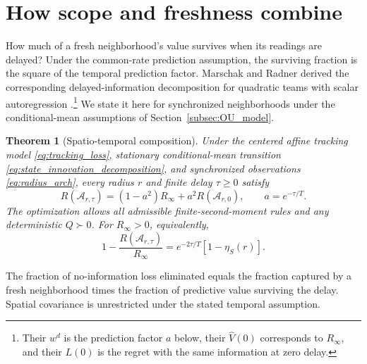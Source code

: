 \documentclass[11pt]{article}
\newtheorem{theorem}{Theorem}
\begin{document}
\section{How scope and freshness combine}
\label{sec:spatiotemporal_predictability}
\label{sec:fresh_local_global}

How much of a fresh neighborhood's value survives when its readings are
delayed? Under the common-rate prediction assumption, the surviving
fraction is the square of the temporal prediction factor. Marschak and
Radner derived the corresponding delayed-information decomposition for
quadratic teams with scalar autoregression
\cite[Ch.~7, Sec.~4, Eqs.~(4.21)--(4.22)]{marschak1972economic}.\footnote{Their
$w^d$ is the prediction factor $a$ below, their $\widehat V(0)$ corresponds
to $R_\infty$, and their $L(0)$ is the regret with the same information at
zero delay.}
We state it here for synchronized neighborhoods under the conditional-mean
assumptions of Section~\ref{subsec:OU_model}.

\begin{theorem}[Spatio-temporal composition]
\label{thm:spatiotemporal_composition}
Under the centered affine tracking model \eqref{eq:tracking_loss}, stationary
conditional-mean transition \eqref{eq:state_innovation_decomposition}, and
synchronized observations \eqref{eq:radius_arch}, every radius $r$ and finite
delay $\tau\ge0$ satisfy
\begin{equation}
\boxed{R(\mathcal A_{r,\tau})=(1-a^2)R_\infty+a^2R(\mathcal A_{r,0}),
\qquad a=e^{-\tau/T}.}
\label{eq:regret_composition_unnormalized}
\end{equation}
The optimization allows all admissible finite-second-moment rules and any
deterministic $Q\succ0$. For $R_\infty>0$, equivalently,
\begin{equation}
\boxed{1-\frac{R(\mathcal A_{r,\tau})}{R_\infty}
=e^{-2\tau/T}[1-\eta_S(r)].}
\label{eq:regret_composition_normalized}
\end{equation}
\end{theorem}
The fraction of no-information loss eliminated equals the fraction captured
by a fresh neighborhood times the fraction of predictive value surviving
the delay. Spatial covariance is unrestricted under the stated temporal
assumption.
\end{document}
